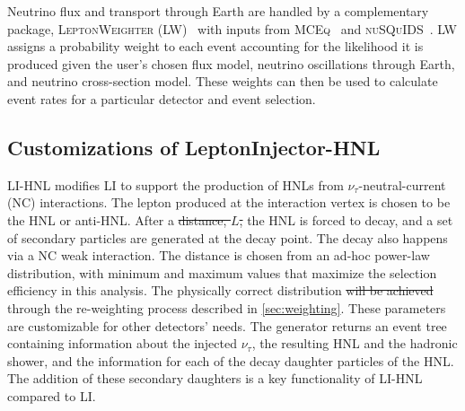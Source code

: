 \documentclass[
    aps,
    prd,
    reprint,
    amsmath,
    amssymb,
    nofootinbib,
    superscriptaddress,
    floatfix
]{revtex4-2}
\providecommand{\DIFaddtex}[1]{{\protect\color{blue}\uwave{#1}}} %
\providecommand{\DIFdeltex}[1]{{\protect\color{red}\sout{#1}}}                      %
\providecommand{\DIFaddbegin}{} %
\providecommand{\DIFaddend}{} %
\providecommand{\DIFdelbegin}{} %
\providecommand{\DIFdelend}{} %
\providecommand{\DIFadd}[1]{\texorpdfstring{\DIFaddtex{#1}}{#1}} %
\providecommand{\DIFdel}[1]{\texorpdfstring{\DIFdeltex{#1}}{}} %
\newcommand{\DIFscaledelfig}{0.5}
\newlength{\DIFdelgraphicswidth} %
\newlength{\DIFdelgraphicsheight} %
\newcommand{\DIFaddincludegraphics}[2][]{{\color{blue}\fbox{\DIFOincludegraphics[#1]{#2}}}} %
\newcommand{\DIFdelincludegraphics}[2][]{%
\sbox{\DIFdelgraphicsbox}{\DIFOincludegraphics[#1]{#2}}%
\settoboxwidth{\DIFdelgraphicswidth}{\DIFdelgraphicsbox} %
\settoboxtotalheight{\DIFdelgraphicsheight}{\DIFdelgraphicsbox} %
\scalebox{\DIFscaledelfig}{%
\parbox[b]{\DIFdelgraphicswidth}{\usebox{\DIFdelgraphicsbox}\\[-\baselineskip] \rule{\DIFdelgraphicswidth}{0em}}\llap{\resizebox{\DIFdelgraphicswidth}{\DIFdelgraphicsheight}{%
\setlength{\unitlength}{\DIFdelgraphicswidth}%
\begin{picture}(1,1)%
\thicklines\linethickness{2pt} %
{\color[rgb]{1,0,0}\put(0,0){\framebox(1,1){}}}%
{\color[rgb]{1,0,0}\put(0,0){\line( 1,1){1}}}%
{\color[rgb]{1,0,0}\put(0,1){\line(1,-1){1}}}%
\end{picture}%
}\hspace*{3pt}}} %
} %
\DeclareRobustCommand{\DIFaddbegin}{\DIFOaddbegin \let\includegraphics\DIFaddincludegraphics} %
\DeclareRobustCommand{\DIFaddend}{\DIFOaddend \let\includegraphics\DIFOincludegraphics} %
\DeclareRobustCommand{\DIFdelbegin}{\DIFOdelbegin \let\includegraphics\DIFdelincludegraphics} %
\DeclareRobustCommand{\DIFdelend}{\DIFOaddend \let\includegraphics\DIFOincludegraphics} %
\begin{document}
Neutrino flux and transport through Earth are handled by a complementary package, \textsc{LeptonWeighter} (LW)~\cite{IceCube:2020tcq} with inputs from \textsc{MCEq}~\cite{Fedynitch:2018cbl} and \textsc{nuSQuIDS}~\cite{Arguelles:2021twb}.
LW assigns a probability weight to each event accounting for the likelihood it is produced given the user's chosen flux model, neutrino oscillations through Earth, and neutrino cross-section model.
These weights can then be used to calculate event rates for a particular detector and event selection.


\subsection{Customizations of LeptonInjector-HNL}

LI-HNL modifies LI to support the production of HNLs from $\nu_\tau$-neutral-current (NC) interactions. 
The lepton produced at the interaction vertex is chosen to be the HNL or anti-HNL. 
After a \DIFdelbegin \DIFdel{distance, $L$,  }\DIFdelend \DIFaddbegin \DIFadd{chosen distance, }\DIFaddend the HNL is forced to decay, and a set of secondary particles are generated at the decay point. The decay also happens via a NC weak interaction.
The distance is chosen from an ad-hoc power-law distribution, with minimum and maximum values that maximize the selection efficiency in this analysis. The physically correct distribution \DIFdelbegin \DIFdel{will be achieved }\DIFdelend \DIFaddbegin \DIFadd{is obtained }\DIFaddend through the re-weighting process described in \cref{sec:weighting}.
These parameters are customizable for other detectors' needs.
The generator returns an event tree containing information about the injected $\nu_\tau$, the resulting HNL and the hadronic shower, and the information for each of the decay daughter particles of the HNL.
The addition of these secondary daughters is a key functionality of LI-HNL compared to LI.
\end{document}
